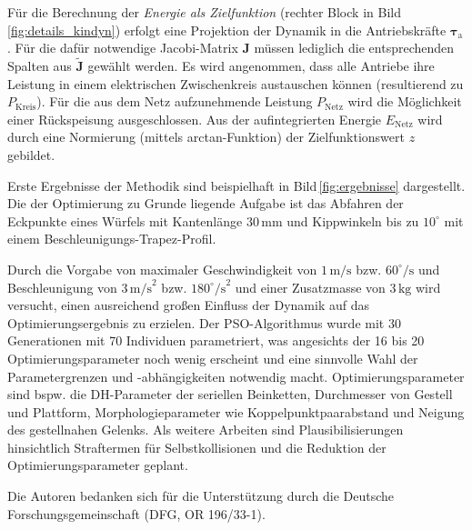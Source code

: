 \documentclass[fleqn,a4paper,10pt]{article}
\newcommand{\bm}[1]{\mathbf{#1}}
\renewenvironment{figure}
  {\par\vspace{6pt}\noindent\minipage{\linewidth}}
  {\endminipage\par\vspace{6pt}}
\begin{document}
Für die Berechnung der \emph{Energie als Zielfunktion} (rechter Block in Bild\,\ref{fig:details_kindyn}) erfolgt eine Projektion der Dynamik in die Antriebskräfte $\bm{\tau}_\mathrm{a}$. 
Für die dafür notwendige Jacobi-Matrix $\bm{J}$ müssen lediglich die entsprechenden Spalten aus $\tilde{\bm{J}}$ gewählt werden.
Es wird angenommen, dass alle Antriebe ihre Leistung in einem elektrischen Zwischenkreis austauschen können (resultierend zu $P_\mathrm{Kreis}$).
Für die aus dem Netz aufzunehmende Leistung $P_\mathrm{Netz}$ wird die Möglichkeit einer  Rückspeisung ausgeschlossen.
Aus der aufintegrierten Energie $E_\mathrm{Netz}$ wird durch eine Normierung (mittels arctan-Funktion) der Zielfunktionswert $z$ gebildet.

Erste Ergebnisse der Methodik sind beispielhaft in Bild\,\ref{fig:ergebnisse} dargestellt.
Die der Optimierung zu Grunde liegende Aufgabe ist das Abfahren der Eckpunkte eines Würfels mit Kantenlänge $30\,\textrm{mm}$ und Kippwinkeln bis zu $10^\circ$ mit einem Beschleunigungs-Trapez-Profil.

\begin{figure}
    \centering
    
    \label{fig:ergebnisse}
\end{figure}

Durch die Vorgabe von maximaler Geschwindigkeit von $1\,\textrm{m/s}$ bzw. $60^\circ\textrm{/s}$ und Beschleunigung von $3\,\textrm{m/s}^2$ bzw. $180^\circ\textrm{/s}^2$ und einer Zusatzmasse von $3\,\textrm{kg}$ wird versucht, einen ausreichend großen Einfluss der Dynamik auf das Optimierungsergebnis zu erzielen.
Der PSO-Algorithmus wurde mit 30 Generationen mit 70 Individuen parametriert, was angesichts der 16 bis 20 Optimierungsparameter noch wenig erscheint und eine sinnvolle Wahl der Parametergrenzen und -abhängigkeiten notwendig macht.
Optimierungsparameter sind bspw. die DH-Parameter der seriellen Beinketten, Durchmesser von Gestell und Plattform, Morphologieparameter wie Koppelpunktpaarabstand und Neigung des gestellnahen Gelenks. 
Als weitere Arbeiten sind Plausibilisierungen hinsichtlich Straftermen für Selbstkollisionen und die Reduktion der Optimierungsparameter geplant.

Die Autoren bedanken sich für die Unterstützung durch die Deutsche Forschungsgemeinschaft (DFG, OR 196/33-1).

\vspace{18pt} 
\end{document}

